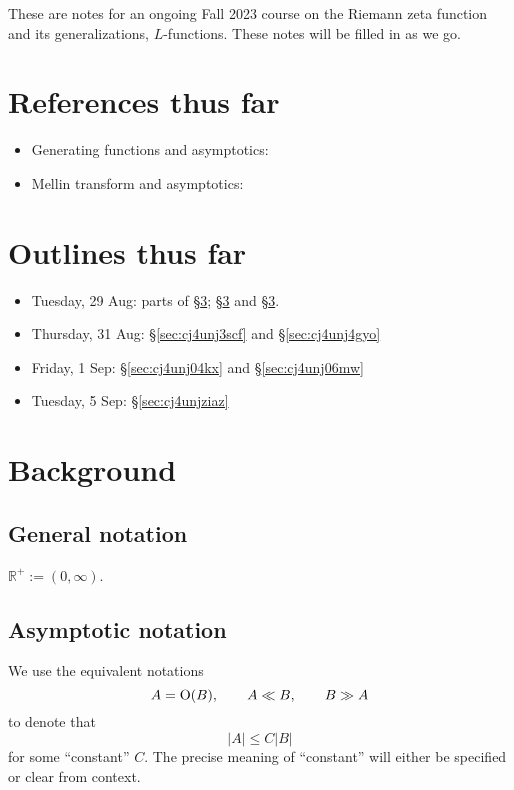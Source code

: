 \documentclass[reqno]{amsart}  \numberwithin{theorem}{section} \numberwithin{equation}{section}
\begin{document}
These are notes for an ongoing Fall 2023 course on the Riemann zeta function and its generalizations, $L$-functions.  These notes will be filled in as we go.

\newpage

\section{References thus far}
\begin{itemize}
\item Generating functions and asymptotics: \cite[\S5.2]{MR2172781}
\item Mellin transform and asymptotics: \cite{zagier-mellin}
\end{itemize}

\section{Outlines thus far}
\begin{itemize}
\item Tuesday, 29 Aug: parts of \S\ref{sec:cj4unj5r3k}; \S\ref{sec:cj4unj5r3k} and \S\ref{sec:cj4unj5r3k}.
\item Thursday, 31 Aug: \S\ref{sec:cj4unj3scf} and \S\ref{sec:cj4unj4gyo}
\item Friday, 1 Sep: \S\ref{sec:cj4unj04kx} and \S\ref{sec:cj4unj06mw}
\item Tuesday, 5 Sep: \S\ref{sec:cj4unjziaz}
\end{itemize}



\section{Background}\label{sec:cj4unj5r3k}

\subsection{General notation}
$\mathbb{R}^+ := (0,\infty)$.

\subsection{Asymptotic notation}
We use the equivalent notations
\begin{equation*}
  A = \operatorname{O}(B), \qquad A \ll B,
  \qquad B \gg A
\end{equation*}
to denote that
\begin{equation*}
  \lvert A \rvert \leq C \lvert B \rvert
\end{equation*}
for some ``constant'' $C$.  The precise meaning of ``constant'' will either be specified or clear from context.
\end{document}
